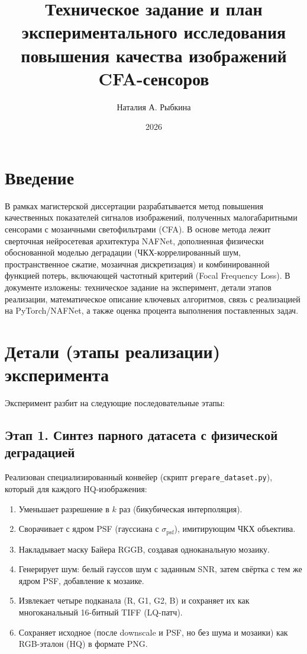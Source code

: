 \documentclass[12pt,a4paper]{article}
\title{Техническое задание и план экспериментального исследования \\ повышения качества изображений CFA-сенсоров}
\author{Наталия А. Рыбкина}
\date{2026}
\begin{document}
\maketitle

\section*{Введение}
В рамках магистерской диссертации разрабатывается метод повышения качественных показателей сигналов изображений, полученных малогабаритными сенсорами с мозаичными светофильтрами (CFA). В основе метода лежит сверточная нейросетевая архитектура NAFNet, дополненная физически обоснованной моделью деградации (ЧКХ-коррелированный шум, пространственное сжатие, мозаичная дискретизация) и комбинированной функцией потерь, включающей частотный критерий (Focal Frequency Loss). В документе изложены: техническое задание на эксперимент, детали этапов реализации, математическое описание ключевых алгоритмов, связь с реализацией на PyTorch/NAFNet, а также оценка процента выполнения поставленных задач.

\section{Детали (этапы реализации) эксперимента}

Эксперимент разбит на следующие последовательные этапы:

\subsection{Этап 1. Синтез парного датасета с физической деградацией}
Реализован специализированный конвейер (скрипт \texttt{prepare\_dataset.py}), который для каждого HQ-изображения:
\begin{enumerate}
    \item Уменьшает разрешение в $k$ раз (бикубическая интерполяция).
    \item Сворачивает с ядром PSF (гауссиана с $\sigma_{\text{psf}}$), имитирующим ЧКХ объектива.
    \item Накладывает маску Байера RGGB, создавая одноканальную мозаику.
    \item Генерирует шум: белый гауссов шум с заданным SNR, затем свёртка с тем же ядром PSF, добавление к мозаике.
    \item Извлекает четыре подканала (R, G1, G2, B) и сохраняет их как многоканальный 16-битный TIFF (LQ-патч).
    \item Сохраняет исходное (после downscale и PSF, но без шума и мозаики) как RGB-эталон (HQ) в формате PNG.
\end{enumerate}
\end{document}
